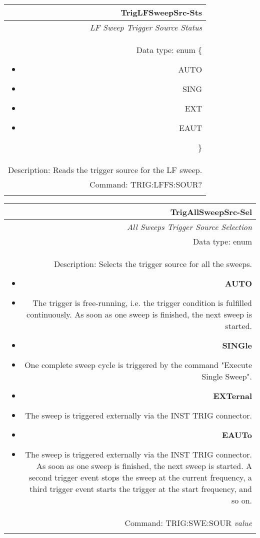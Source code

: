 \documentclass[openany]{article}
\begin{document}
		\begin{tabular}{N}
			\hline
			\bfseries TrigLFSweepSrc-Sts \\ \hline
			\emph{LF Sweep Trigger Source Status} \\
			Data type: enum \{\begin{itemize}[noitemsep]
				\small
				\item[] AUTO
				\item[] SING
				\item[] EXT
				\item[] EAUT
			\end{itemize}\} \\ 
			Description: Reads the trigger source for the LF sweep. \\
			Command: TRIG:LFFS:SOUR? \\
			\\

		\end{tabular}


		\begin{tabular}{N}
			\hline
			\bfseries TrigAllSweepSrc-Sel \\ \hline
			\emph{All Sweeps Trigger Source Selection} \\
			Data type: enum \\   
			Description: Selects the trigger source for all the sweeps.\begin{itemize}[noitemsep]
				\small
				\item[] \textbf{AUTO}
				\item[] The trigger is free-running, i.e. the trigger condition is fulfilled continuously. As soon as one sweep is finished, the next sweep is started.
                                \item[] \textbf{SINGle}
				\item[] One complete sweep cycle is triggered by the command "Execute Single Sweep".
				\item[] \textbf{EXTernal}
				\item[] The sweep is triggered externally via the INST TRIG connector.
                                \item[] \textbf{EAUTo}
				\item[] The sweep is triggered externally via the INST TRIG connector. As soon as one sweep is finished, the next sweep is started. A second trigger event stops the sweep at the current frequency, a third trigger event starts the trigger at the start frequency, and so on.

			\end{itemize} \\
			Command: TRIG:SWE:SOUR \emph{value} \\
			\\

		\end{tabular}
\end{document}

